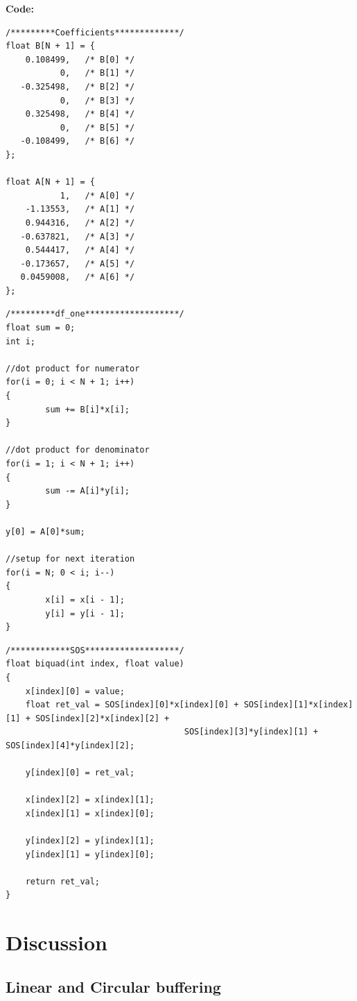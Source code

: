 \documentclass{article}
\begin{document}
\pagebreak

\textbf{Code:}

\begin{verbatim}
/*********Coefficients*************/
float B[N + 1] = {
    0.108499,	/* B[0] */
           0,	/* B[1] */
   -0.325498,	/* B[2] */
           0,	/* B[3] */
    0.325498,	/* B[4] */
           0,	/* B[5] */
   -0.108499,	/* B[6] */
};

float A[N + 1] = {
           1,	/* A[0] */
    -1.13553,	/* A[1] */
    0.944316,	/* A[2] */
   -0.637821,	/* A[3] */
    0.544417,	/* A[4] */
   -0.173657,	/* A[5] */
   0.0459008,	/* A[6] */
};
\end{verbatim}

\begin{verbatim}
/*********df_one*******************/
float sum = 0;
int i;

//dot product for numerator
for(i = 0; i < N + 1; i++)
{
		sum += B[i]*x[i];
}

//dot product for denominator
for(i = 1; i < N + 1; i++)
{
		sum -= A[i]*y[i];
}

y[0] = A[0]*sum;

//setup for next iteration
for(i = N; 0 < i; i--)
{
		x[i] = x[i - 1];
		y[i] = y[i - 1];
}
\end{verbatim}

\begin{verbatim}
/************SOS*******************/
float biquad(int index, float value)
{
	x[index][0] = value;
	float ret_val = SOS[index][0]*x[index][0] + SOS[index][1]*x[index][1] + SOS[index][2]*x[index][2] +
									SOS[index][3]*y[index][1] + SOS[index][4]*y[index][2];

	y[index][0] = ret_val;

	x[index][2] = x[index][1];
	x[index][1] = x[index][0];

	y[index][2] = y[index][1];
	y[index][1] = y[index][0];

	return ret_val;
}
\end{verbatim}


\section{Discussion}

\subsection{Linear and Circular buffering}
\end{document}
